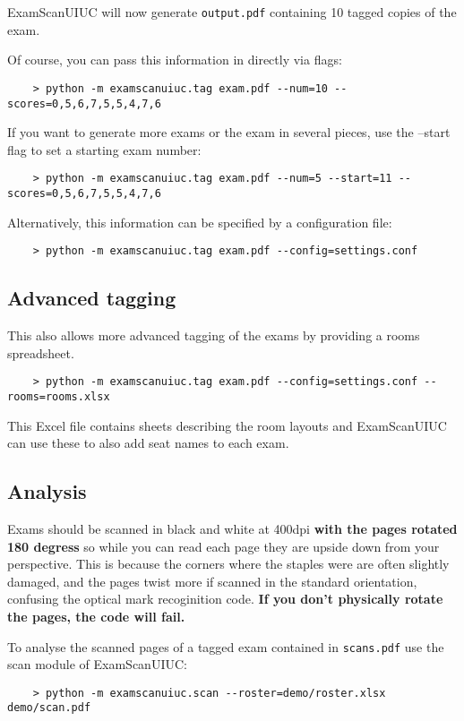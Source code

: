 \documentclass[a4paper]{article}
\begin{document}
ExamScanUIUC will now generate \texttt{output.pdf} containing 10 tagged copies of the exam.

Of course, you can pass this information in directly via flags:
\begin{lstlisting}
	> python -m examscanuiuc.tag exam.pdf --num=10 --scores=0,5,6,7,5,5,4,7,6
\end{lstlisting}

If you want to generate more exams or the exam in several pieces, use the --start flag to set a starting exam number:
\begin{lstlisting}
	> python -m examscanuiuc.tag exam.pdf --num=5 --start=11 --scores=0,5,6,7,5,5,4,7,6
\end{lstlisting}

Alternatively, this information can be specified by a configuration file:
\begin{lstlisting}
	> python -m examscanuiuc.tag exam.pdf --config=settings.conf
\end{lstlisting}

\subsection{Advanced tagging}

This also allows more advanced tagging of the exams by providing a rooms spreadsheet.
\begin{lstlisting}
	> python -m examscanuiuc.tag exam.pdf --config=settings.conf --rooms=rooms.xlsx
\end{lstlisting}
This Excel file contains sheets describing the room layouts and ExamScanUIUC can use these to also add seat names to each exam.

\subsection{Analysis}

Exams should be scanned in black and white at 400dpi \textbf{with the
  pages rotated 180 degress} so while you can read each page they are
upside down from your perspective. This is because the corners where
the staples were are often slightly damaged, and the pages twist more
if scanned in the standard orientation, confusing the optical mark
recoginition code. \textbf{If you don't physically rotate the pages, the code will fail.}

To analyse the scanned pages of a tagged exam contained in \texttt{scans.pdf} use the scan module of ExamScanUIUC:
\begin{lstlisting}
	> python -m examscanuiuc.scan --roster=demo/roster.xlsx demo/scan.pdf
\end{lstlisting}
\end{document}
